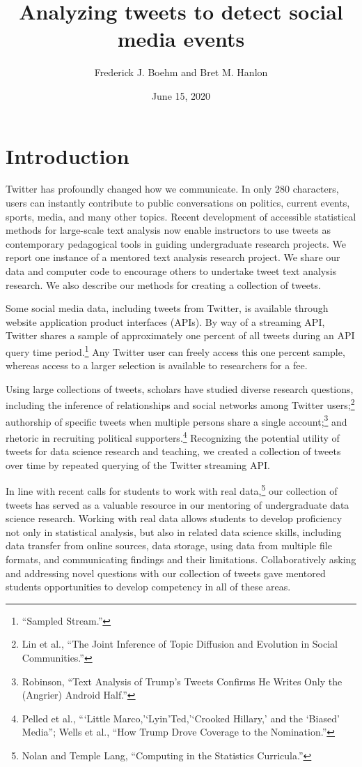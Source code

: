 \documentclass[
]{article}
\title{Analyzing tweets to detect social media events}
\author{Frederick J. Boehm and Bret M. Hanlon}
\date{June 15, 2020}
\begin{document}
\maketitle

\hypertarget{introduction}{%
\section{Introduction}\label{introduction}}

Twitter has profoundly changed how we communicate. In only 280
characters, users can instantly contribute to public conversations on
politics, current events, sports, media, and many other topics. Recent
development of accessible statistical methods for large-scale text
analysis now enable instructors to use tweets as contemporary
pedagogical tools in guiding undergraduate research projects. We report
one instance of a mentored text analysis research project. We share our
data and computer code to encourage others to undertake tweet text
analysis research. We also describe our methods for creating a
collection of tweets.

Some social media data, including tweets from Twitter, is available
through website application product interfaces (APIs). By way of a
streaming API, Twitter shares a sample of approximately one percent of
all tweets during an API query time period.\footnote{``Sampled Stream.''}
Any Twitter user can freely access this one percent sample, whereas
access to a larger selection is available to researchers for a fee.

Using large collections of tweets, scholars have studied diverse
research questions, including the inference of relationships and social
networks among Twitter users;\footnote{Lin et al., ``The Joint Inference
  of Topic Diffusion and Evolution in Social Communities.''} authorship
of specific tweets when multiple persons share a single
account;\footnote{Robinson, ``Text Analysis of Trump's Tweets Confirms
  He Writes Only the (Angrier) Android Half.''} and rhetoric in
recruiting political supporters.\footnote{Pelled et al., ```Little
  Marco,'`Lyin'Ted,'`Crooked Hillary,' and the `Biased' Media''; Wells
  et al., ``How Trump Drove Coverage to the Nomination.''} Recognizing
the potential utility of tweets for data science research and teaching,
we created a collection of tweets over time by repeated querying of the
Twitter streaming API.

In line with recent calls for students to work with real data,\footnote{Nolan
  and Temple Lang, ``Computing in the Statistics Curricula.''} our
collection of tweets has served as a valuable resource in our mentoring
of undergraduate data science research. Working with real data allows
students to develop proficiency not only in statistical analysis, but
also in related data science skills, including data transfer from online
sources, data storage, using data from multiple file formats, and
communicating findings and their limitations. Collaboratively asking and
addressing novel questions with our collection of tweets gave mentored
students opportunities to develop competency in all of these areas.
\end{document}
